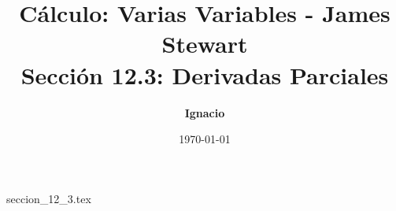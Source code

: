 \documentclass[11pt,spanish,oneside]{report}
\title{\textbf{Cálculo: Varias Variables - James Stewart} \\ \Large Sección 12.3: Derivadas Parciales}
\author{\textbf{Ignacio}}
\date{\today}
\begin{document}
\maketitle

{seccion_12_3.tex}
\end{document}
